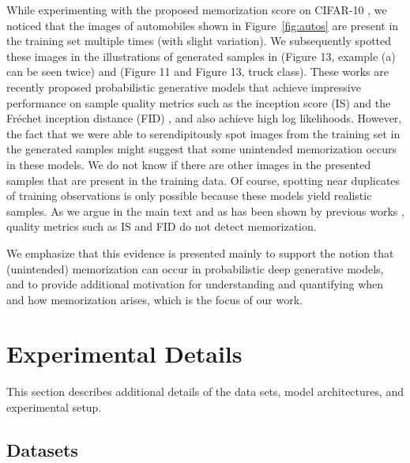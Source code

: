 \documentclass{article}
\begin{document}
While experimenting with the proposed memorization score on CIFAR-10 
\cite{krizhevsky2009learning}, we noticed that the images of automobiles shown 
in Figure~\ref{fig:autos} are present in the training set multiple times (with 
slight variation). We subsequently spotted these images in the illustrations 
of generated samples in \cite{ho2020denoising} (Figure 13, example (a) can be 
seen twice) and \cite{song2021scorebased} (Figure 11 and Figure 13, truck 
class). These works are recently proposed probabilistic generative models that 
achieve impressive performance on sample quality metrics such as the inception 
score (IS) \cite{salimans2016improved} and the Fr\'echet inception distance 
(FID) \cite{heusel2017gans}, and also achieve high log likelihoods.  However, 
the fact that we were able to serendipitously spot images from the training 
set in the generated samples might suggest that some unintended memorization 
occurs in these models. We do not know if there are other images in the 
presented samples that are present in the training data. Of course, spotting 
near duplicates of training observations is only possible because these models 
yield realistic samples. As we argue in the main text and as has been shown by 
previous works \cite{gulrajani2018towards,webster2019detecting}, quality 
metrics such as IS and FID do not detect memorization.

We emphasize that this evidence is presented mainly to support the notion that 
(unintended) memorization can occur in probabilistic deep generative models, 
and to provide additional motivation for understanding and quantifying when 
and how memorization arises, which is the focus of our work.

\section{Experimental Details}
\label{app:details}

This section describes additional details of the data sets, model 
architectures, and experimental setup.

\subsection{Datasets}%
\label{sub:datasets}
\end{document}
